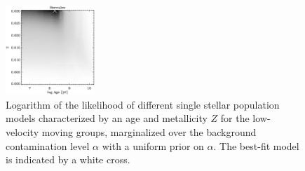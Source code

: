 \begin{figure}
\begin{center}
\includegraphics[width=0.3\textwidth]{figs_groups/fit_ssp_fixpij_hercules.eps}
\caption[Logarithm of the likelihood of different single stellar
population models marginalized over the background contamination
level]{Logarithm of the likelihood of different single stellar
population models characterized by an age and metallicity $Z$ for the
low-velocity moving groups, marginalized over the background
contamination level $\alpha$ with a uniform prior on $\alpha$. The
best-fit model is indicated by a white cross.}\label{fig:fit_ssp}
\end{center}
\end{figure}


